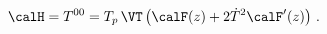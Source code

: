 \begin{equation}
 \calH =T^{00}=T_p\, \VT \left(\calF(z) +2 \dot{T}^2
 \calF'(z)\right)\,.\label{T00}
\end{equation}

